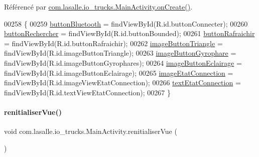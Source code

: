 Référencé par \hyperlink{_main_activity_8java_source_l00059}{com.\+lasalle.\+io\+\_\+trucks.\+Main\+Activity.\+on\+Create()}.


\begin{DoxyCode}
00258     \{
00259         \hyperlink{classcom_1_1lasalle_1_1io__trucks_1_1_main_activity_a2197b0145db353437c41d1fc57f28650}{buttonBluetooth} = findViewById(R.id.buttonConnecter);
00260         \hyperlink{classcom_1_1lasalle_1_1io__trucks_1_1_main_activity_a74b2f440caeb7d27d9bd62d87f106156}{buttonRechercher} = findViewById(R.id.buttonBounded);
00261         \hyperlink{classcom_1_1lasalle_1_1io__trucks_1_1_main_activity_ac138932ce8d8dd12d7eb35496a1c9a16}{buttonRafraichir} = findViewById(R.id.buttonRafraichir);
00262         \hyperlink{classcom_1_1lasalle_1_1io__trucks_1_1_main_activity_abe65c5762df1b63ee18b51fcb1bb23c8}{imageButtonTriangle} = findViewById(R.id.imageButtonTriangle);
00263         \hyperlink{classcom_1_1lasalle_1_1io__trucks_1_1_main_activity_aed3dc707e8acf48e821ebda3312a0dca}{imageButtonGyrophare} = findViewById(R.id.imageButtonGyrophares);
00264         \hyperlink{classcom_1_1lasalle_1_1io__trucks_1_1_main_activity_a1cc3f48aebca6c187b2a964fa6f569fc}{imageButtonEclairage} = findViewById(R.id.imageButtonEclairage);
00265         \hyperlink{classcom_1_1lasalle_1_1io__trucks_1_1_main_activity_aa9d2b0a05a522c372879d3c35294d7bc}{imageEtatConnection} = findViewById(R.id.imageViewEtatConnection);
00266         \hyperlink{classcom_1_1lasalle_1_1io__trucks_1_1_main_activity_a62ce189c543dda03ed48e00c10623677}{textEtatConnection} = findViewById(R.id.textViewEtatConnection);
00267     \}
\end{DoxyCode}
\mbox{\label{classcom_1_1lasalle_1_1io__trucks_1_1_main_activity_ac4c0bdaf761a42e924c6cf9d1b9a0e23}} 
\paragraph{\texorpdfstring{renitialiser\+Vue()}{renitialiserVue()}}
{\footnotesize\ttfamily void com.\+lasalle.\+io\+\_\+trucks.\+Main\+Activity.\+renitialiser\+Vue (\begin{DoxyParamCaption}{ }\end{DoxyParamCaption})\hspace{0.3cm}{\ttfamily [private]}}



